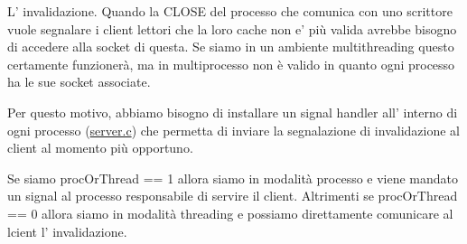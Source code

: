 L' invalidazione. Quando la C\+L\+O\+S\+E del processo che comunica con uno scrittore vuole segnalare i client lettori che la loro cache non e' più valida avrebbe bisogno di accedere alla socket di questa. Se siamo in un ambiente multithreading questo certamente funzionerà, ma in multiprocesso non è valido in quanto ogni processo ha le sue socket associate.

Per questo motivo, abbiamo bisogno di installare un signal handler all' interno di ogni processo (\hyperlink{server_8c}{server.\+c}) che permetta di inviare la segnalazione di invalidazione al client al momento più opportuno.

Se siamo proc\+Or\+Thread == 1 allora siamo in modalità processo e viene mandato un signal al processo responsabile di servire il client. Altrimenti se proc\+Or\+Thread == 0 allora siamo in modalità threading e possiamo direttamente comunicare al lcient l' invalidazione. 